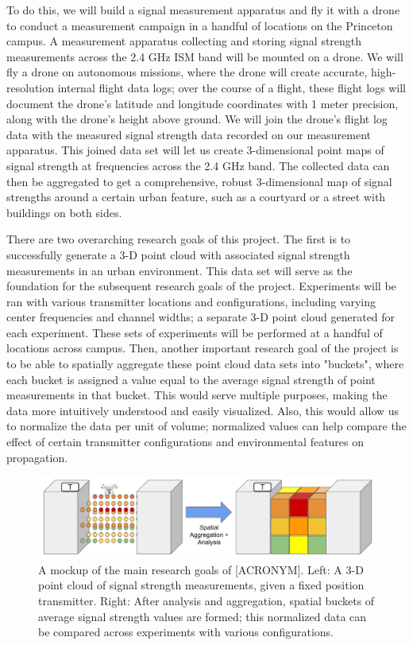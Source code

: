 \documentclass[pageno]{jpaper}
\begin{document}
To do this, we will build a signal measurement apparatus and fly it with a drone to conduct a measurement campaign in a handful of locations on the Princeton campus. A measurement apparatus collecting and storing signal strength measurements across the 2.4 GHz ISM band will be mounted on a drone. We will fly a drone on autonomous missions, where the drone will create accurate, high-resolution internal flight data logs; over the course of a flight, these flight logs will document the drone's latitude and longitude coordinates with 1 meter precision, along with the drone's height above ground. We will join the drone's flight log data with the measured signal strength data recorded on our measurement apparatus. This joined data set will let us create 3-dimensional point maps of signal strength at frequencies across the 2.4 GHz band. The collected data can then be aggregated to get a comprehensive, robust 3-dimensional map of signal strengths around a certain urban feature, such as a courtyard or a street with buildings on both sides.

There are two overarching research goals of this project. The first is to successfully generate a 3-D point cloud with associated signal strength measurements in an urban environment. This data set will serve as the foundation for the subsequent research goals of the project. Experiments will be ran with various transmitter locations and configurations, including varying center frequencies and channel widths; a separate 3-D point cloud generated for each experiment. These sets of experiments will be performed at a handful of locations across campus. Then, another important research goal of the project is to be able to spatially aggregate these point cloud data sets into "buckets", where each bucket is assigned a value equal to the average signal strength of point measurements in that bucket. This would serve multiple purposes, making the data more intuitively understood and easily visualized. Also, this would allow us to normalize the data per unit of volume; normalized values can help compare the effect of certain transmitter configurations and environmental features on propagation.

\begin{figure}[h]
	\caption{A mockup of the main research goals of [ACRONYM]. Left: A 3-D point cloud of signal strength measurements, given a fixed position transmitter. Right: After analysis and aggregation, spatial buckets of average signal strength values are formed; this normalized data can be compared across experiments with various configurations.}
	\includegraphics{measurement_goal}
	\centering
\end{figure}
\end{document}
